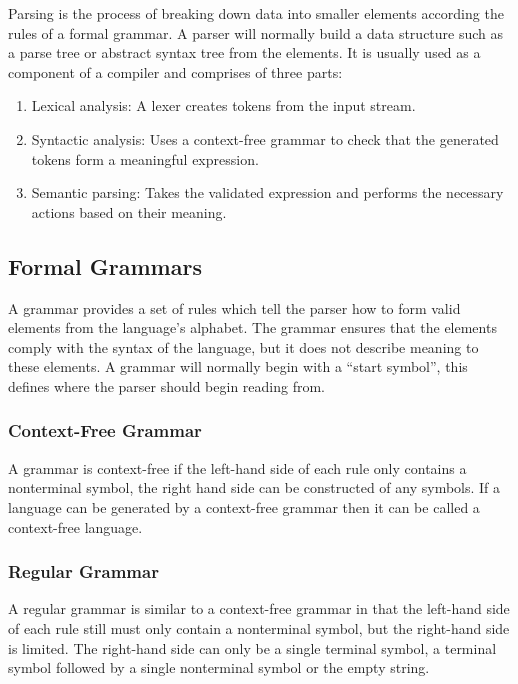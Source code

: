 \documentclass{report}
\begin{document}
Parsing is the process of breaking down data into smaller elements according the rules of a formal grammar. A parser will normally build a data structure such as a parse tree or abstract syntax tree from the elements. It is usually used as a component of a compiler and comprises of three parts: 

\begin{enumerate}
\item Lexical analysis: A lexer creates tokens from the input stream.

\item Syntactic analysis: Uses a context-free grammar to check that the generated tokens form a meaningful expression.

\item Semantic parsing: Takes the validated expression and performs the necessary actions based on their meaning.
\end{enumerate}

\subsection{Formal Grammars}

A grammar provides a set of rules which tell the parser how to form valid elements from the language's alphabet. The grammar ensures that the elements comply with the syntax of the language, but it does not describe meaning to these elements. A grammar will normally begin with a ``start symbol'', this defines where the parser should begin reading from.

\subsubsection{Context-Free Grammar}

A grammar is context-free if the left-hand side of each rule only contains a nonterminal symbol, the right hand side can be constructed of any symbols. If a language can be generated by a context-free grammar then it can be called a context-free language.

\subsubsection{Regular Grammar}

A regular grammar is similar to a context-free grammar in that the left-hand side of each rule still must only contain a nonterminal symbol, but the right-hand side is limited. The right-hand side can only be a single terminal symbol, a terminal symbol followed by a single nonterminal symbol or the empty string.
\end{document}
